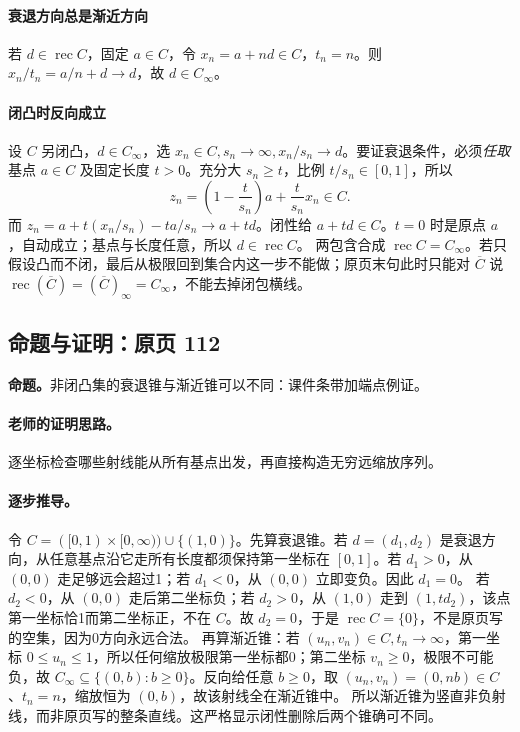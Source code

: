 \paragraph{衰退方向总是渐近方向}
若 $d\in\operatorname{rec}C$，固定 $a\in C$，令 $x_n=a+nd\in C$，$t_n=n$。则 $x_n/t_n=a/n+d\to d$，故 $d\in C_\infty$。
\paragraph{闭凸时反向成立}
设 $C$ 另闭凸，$d\in C_\infty$，选 $x_n\in C,s_n\to\infty,x_n/s_n\to d$。要证衰退条件，必须\emph{任取}基点 $a\in C$ 及固定长度 $t>0$。充分大 $s_n\ge t$，比例 $t/s_n\in[0,1]$，所以
\[z_n=\left(1-\frac t{s_n}\right)a+\frac t{s_n}x_n\in C.\]
而 $z_n=a+t(x_n/s_n)-ta/s_n\to a+td$。闭性给 $a+td\in C$。$t=0$ 时是原点 $a$，自动成立；基点与长度任意，所以 $d\in\operatorname{rec}C$。
两包含合成 $\operatorname{rec}C=C_\infty$。若只假设凸而不闭，最后从极限回到集合内这一步不能做；原页末句此时只能对 $\overline C$ 说 $\operatorname{rec}(\overline C)=(\overline C)_\infty=C_\infty$，不能去掉闭包横线。


\subsection{命题与证明：原页 112}

\textbf{命题。}非闭凸集的衰退锥与渐近锥可以不同：课件条带加端点例证。

\paragraph{老师的证明思路。}逐坐标检查哪些射线能从所有基点出发，再直接构造无穷远缩放序列。

\paragraph{逐步推导。}
令 $C=([0,1)\times[0,\infty))\cup\{(1,0)\}$。先算衰退锥。若 $d=(d_1,d_2)$ 是衰退方向，从任意基点沿它走所有长度都须保持第一坐标在 $[0,1]$。若 $d_1>0$，从 $(0,0)$ 走足够远会超过1；若 $d_1<0$，从 $(0,0)$ 立即变负。因此 $d_1=0$。
若 $d_2<0$，从 $(0,0)$ 走后第二坐标负；若 $d_2>0$，从 $(1,0)$ 走到 $(1,td_2)$，该点第一坐标恰1而第二坐标正，不在 $C$。故 $d_2=0$，于是 $\operatorname{rec}C=\{0\}$，不是原页写的空集，因为0方向永远合法。
再算渐近锥：若 $(u_n,v_n)\in C,t_n\to\infty$，第一坐标 $0\le u_n\le1$，所以任何缩放极限第一坐标都0；第二坐标 $v_n\ge0$，极限不可能负，故 $C_\infty\subseteq\{(0,b):b\ge0\}$。反向给任意 $b\ge0$，取 $(u_n,v_n)=(0,nb)\in C$、$t_n=n$，缩放恒为 $(0,b)$，故该射线全在渐近锥中。
所以渐近锥为竖直非负射线，而非原页写的整条直线。这严格显示闭性删除后两个锥确可不同。


